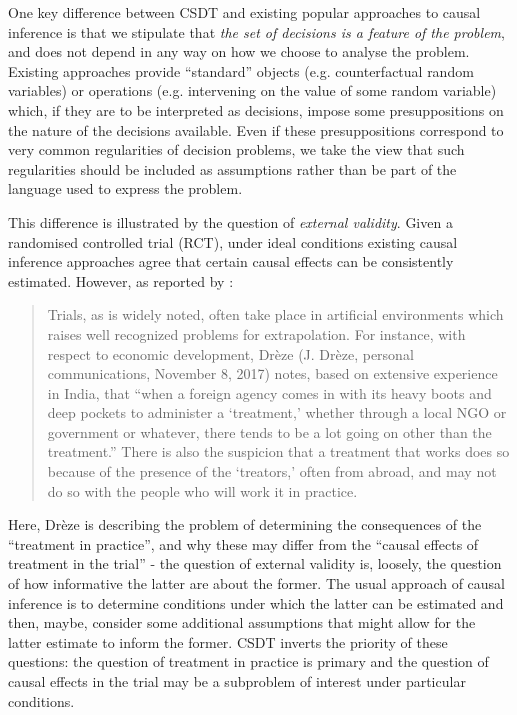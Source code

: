 One key difference between CSDT and existing popular approaches to causal inference is that we stipulate that \emph{the set of decisions is a feature of the problem}, and does not depend in any way on how we choose to analyse the problem. Existing approaches provide ``standard'' objects (e.g. counterfactual random variables) or operations (e.g. intervening on the value of some random variable) which, if they are to be interpreted as decisions, impose some presuppositions on the nature of the decisions available. Even if these presuppositions correspond to very common regularities of decision problems, we take the view that such regularities should be included as assumptions rather than be part of the language used to express the problem.

This difference is illustrated by the question of \emph{external validity}. Given a randomised controlled trial (RCT), under ideal conditions existing causal inference approaches agree that certain causal effects can be consistently estimated. However, as reported by \citet{deaton_understanding_2018}:
\begin{quote}
	Trials, as is widely noted, often take place in artificial environments which raises well recognized problems for extrapolation. For instance, with respect to economic development, Drèze (J. Drèze, personal communications, November 8, 2017) notes, based on extensive experience in India, that “when a foreign agency comes in with its heavy boots and deep pockets to administer a ‘treatment,’ whether through a local NGO or government or whatever, there tends to be a lot going on other than the treatment.” There is also the suspicion that a treatment that works does so because of the presence of the ‘treators,’ often from abroad, and may not do so with the people who will work it in practice.
\end{quote}
Here, Drèze is describing the problem of determining the consequences of the ``treatment in practice'', and why these may differ from the ``causal effects of treatment in the trial'' - the question of external validity is, loosely, the question of how informative the latter are about the former. The usual approach of causal inference is to determine conditions under which the latter can be estimated and then, maybe, consider some additional assumptions that might allow for the latter estimate to inform the former. CSDT inverts the priority of these questions: the question of treatment in practice is primary and the question of causal effects in the trial may be a subproblem of interest under particular conditions. 

